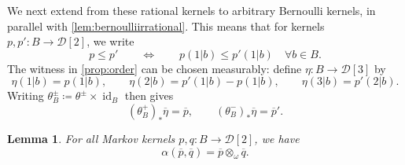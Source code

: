 \documentclass[11pt,a4paper]{scrartcl}
\newcommand{\id}{\operatorname{id}}
\newcommand{\finiteset}[1]{[#1]}	%
\newcommand{\two}{\finiteset{2}}		%
\newcommand{\three}{\finiteset{3}}		%
\newcommand{\dist}{\mathcal{D}}
\newtheorem{lem}[theo]{Lemma}
\theoremstyle{definition}
\begin{document}
We next extend from these rational kernels to arbitrary Bernoulli kernels, in parallel with \cref{lem:bernoulliirrational}.
This means that for kernels $p,p' : B \to \dist\two$, we write
\[
	p \le p' \qquad \Longleftrightarrow \qquad
	p(1|b) \leq p'(1|b) \quad \forall b \in B.
\]
The witness in \cref{prop:order} can be chosen measurably: define $\eta : B \to \dist\three$ by
\[
	\eta(1|b) = p(1|b), \qquad
	\eta(2|b) = p'(1|b)-p(1|b), \qquad
	\eta(3|b) = p'(2|b).
\]
Writing $\theta_B^\pm \coloneq \theta^\pm \times \id_B$ then gives
\[
	(\theta_B^+)_\ast\overline{\eta} = \overline{p},
	\qquad
	(\theta_B^-)_\ast\overline{\eta} = \overline{p}'.
\]

\begin{lem}\label{lem:relative_bernoulliirrational}
	For all Markov kernels $p,q : B \to \dist\two$, we have
	\[
		\alpha(\overline{p},\overline{q})
		= \overline{p} \otimes_\omega \overline{q}.
	\]
\end{lem}
\end{document}
